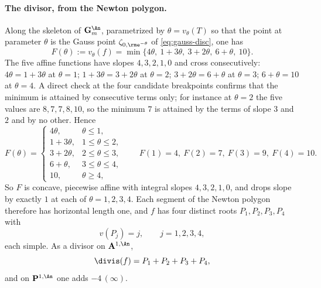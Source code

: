 \paragraph{The divisor, from the Newton polygon.}
Along the skeleton of $\mathbf G_m^{\An}$, parametrized by
$\theta=v_\theta(T)$ so that the point at parameter $\theta$ is the Gauss
point $\zeta_{0,\rme^{-\theta}}$ of \eqref{eq:gauss-disc}, one has
\[
 F(\theta):=v_\theta(f)
 =\min\{4\theta,\ 1+3\theta,\ 3+2\theta,\ 6+\theta,\ 10\}.
\]
The five affine functions have slopes $4,3,2,1,0$ and cross consecutively:
$4\theta=1+3\theta$ at $\theta=1$; $1+3\theta=3+2\theta$ at $\theta=2$;
$3+2\theta=6+\theta$ at $\theta=3$; $6+\theta=10$ at $\theta=4$.  A direct
check at the four candidate breakpoints confirms that the minimum is attained
by consecutive terms only; for instance at $\theta=2$ the five values are
$8,7,7,8,10$, so the minimum $7$ is attained by the terms of slope $3$ and
$2$ and by no other.  Hence
\begin{equation}
\label{eq:ch15-quartic-F}
 F(\theta)=
 \begin{cases}
  4\theta, & \theta\le1,\\
  1+3\theta, & 1\le\theta\le2,\\
  3+2\theta, & 2\le\theta\le3,\\
  6+\theta, & 3\le\theta\le4,\\
  10, & \theta\ge4,
 \end{cases}
 \qquad
 F(1)=4,\ F(2)=7,\ F(3)=9,\ F(4)=10 .
\end{equation}
So $F$ is concave, piecewise affine with integral slopes $4,3,2,1,0$, and
drops slope by exactly $1$ at each of $\theta=1,2,3,4$.  Each segment of the
Newton polygon therefore has horizontal length one, and $f$ has four distinct
roots $P_1,P_2,P_3,P_4$ with
\[
 v(P_j)=j,\qquad j=1,2,3,4 ,
\]
each simple.  As a divisor on $\mathbf A^{1,\An}$,
\begin{equation}
\label{eq:ch15-quartic-divisor}
 \divis(f)=P_1+P_2+P_3+P_4 ,
\end{equation}
and on $\mathbf P^{1,\An}$ one adds $-4\,(\infty)$.

